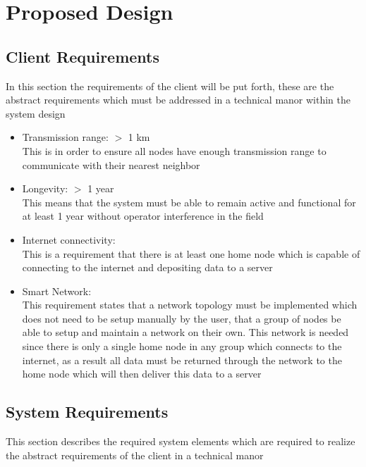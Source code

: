\documentclass[12pt]{article}
\begin{document}
\section{Proposed Design}
\label{sec:Design}

\subsection{Client Requirements}
In this section the requirements of the client will be put forth, these are the abstract requirements which must be addressed in a technical manor within the system design %
\begin{itemize}
\item Transmission range: $>$ 1 km \\
{\small This is in order to ensure all nodes have enough transmission range to communicate with their nearest neighbor}
\item Longevity: $>$ 1 year \\
{\small This means that the system must be able to remain active and functional for at least 1 year without operator interference in the field}
\item Internet connectivity: \\
{\small This is a requirement that there is at least one home node which is capable of connecting to the internet and depositing data to a server}
\item Smart Network: \\
{\small This requirement states that a network topology must be implemented which does not need to be setup manually by the user, that a group of nodes be able to setup and maintain a network on their own. This network is needed since there is only a single home node in any group which connects to the internet, as a result all data must be returned through the network to the home node which will then deliver this data to a server}
\end{itemize}

\subsection{System Requirements}
This section describes the required system elements which are required to realize the abstract requirements of the client in a technical manor %
\end{document}
